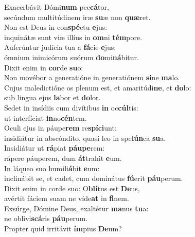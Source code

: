 \oddverse Exacerbávit Dómi\textbf{num} pec\textbf{cá}tor,~\*\\
\oddverse secúndum multitúdinem iræ \textbf{su}æ non \textbf{quæ}ret.\\
\evenverse Non est Deus in con\textbf{spé}ctu \textbf{e}jus:~\*\\
\evenverse inquinátæ sunt viæ illíus in \textbf{om}ni \textbf{tém}pore.\\
\oddverse Auferúntur judícia tua a \textbf{fá}cie \textbf{e}jus:~\*\\
\oddverse ómnium inimicórum suórum \textbf{do}mi\textbf{ná}bitur.\\
\evenverse Dixit enim in \textbf{cor}de \textbf{su}o:~\*\\
\evenverse Non movébor a generatióne in generatiónem \textbf{si}ne \textbf{ma}lo.\\
\oddverse Cujus maledictióne os plenum est, et amaritúdi\textbf{ne}, et \textbf{do}lo:~\*\\
\oddverse sub lingua ejus \textbf{la}bor et \textbf{do}lor.\\
\evenverse Sedet in insídiis cum divítibus \textbf{in} oc\textbf{cúl}tis:~\*\\
\evenverse ut interfíciat \textbf{in}no\textbf{cén}tem.\\
\oddverse Oculi ejus in páupe\textbf{rem} re\textbf{spí}\textbf{ci}unt:~\*\\
\oddverse insidiátur in abscóndito, quasi leo in spe\textbf{lún}ca \textbf{su}a.\\
\evenverse Insidiátur ut \textbf{rá}piat \textbf{páu}\textbf{pe}rem:~\*\\
\evenverse rápere páuperem, dum \textbf{át}trahit \textbf{e}um.\\
\oddverse In láqueo suo humili\textbf{á}bit \textbf{e}um:~\*\\
\oddverse inclinábit se, et cadet, cum dominátus \textbf{fú}erit \textbf{páu}perum.\\
\evenverse Dixit enim in corde suo: O\textbf{blí}tus est \textbf{De}us,~\*\\
\evenverse avértit fáciem suam ne víde\textbf{at} in \textbf{fi}nem.\\
\oddverse Exsúrge, Dómine Deus, exaltétur \textbf{ma}nus \textbf{tu}a:~\*\\
\oddverse ne oblivi\textbf{scá}ris \textbf{páu}perum.\\
\evenverse Propter quid irritávit \textbf{ím}pius \textbf{De}um?~\*\\
